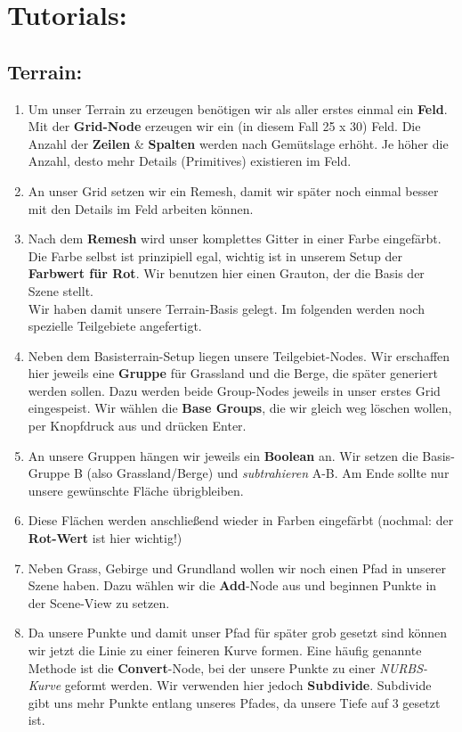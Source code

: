 \documentclass[paper=a4,fontsize=12pt,ngerman]{scrartcl}
\begin{document}
	\section*{\textcolor{rosa}{Tutorials:}}
	\subsection*{Terrain:}
	\begin{enumerate}
		\item Um unser Terrain zu erzeugen benötigen wir als aller erstes einmal ein \textbf{Feld}. Mit der \textbf{Grid-Node} erzeugen wir ein (in diesem Fall 25 x 30) Feld. Die Anzahl der \textbf{Zeilen} \& \textbf{Spalten} werden nach Gemütslage erhöht. Je höher die Anzahl, desto mehr Details (Primitives) existieren im Feld.
		\item An unser Grid setzen wir ein Remesh, damit wir später noch einmal besser mit den Details im Feld arbeiten können.
		\item Nach dem \textbf{Remesh} wird unser komplettes Gitter in einer Farbe eingefärbt. Die Farbe selbst ist prinzipiell egal, wichtig ist in unserem Setup der \textbf{Farbwert für Rot}. Wir benutzen hier einen Grauton, der die Basis der Szene stellt.\\
		Wir haben damit unsere Terrain-Basis gelegt. Im folgenden werden noch spezielle Teilgebiete angefertigt.
		\item Neben dem Basisterrain-Setup liegen unsere Teilgebiet-Nodes. Wir erschaffen hier jeweils eine \textbf{Gruppe} für Grassland und die Berge, die später generiert werden sollen. Dazu werden beide Group-Nodes jeweils in unser erstes Grid eingespeist. Wir wählen die \textbf{Base Groups}, die wir gleich weg löschen wollen, per Knopfdruck aus und drücken Enter.
		\item An unsere Gruppen hängen wir jeweils ein \textbf{Boolean} an. Wir setzen die Basis-Gruppe B (also Grassland/Berge) und \textit{subtrahieren} A-B. Am Ende sollte nur unsere gewünschte Fläche übrigbleiben.
		\item Diese Flächen werden anschließend wieder in Farben eingefärbt (nochmal: der \textbf{Rot-Wert} ist hier wichtig!) 
		\item Neben Grass, Gebirge und Grundland wollen wir noch einen Pfad in unserer Szene haben. Dazu wählen wir die \textbf{Add}-Node aus und beginnen Punkte in der Scene-View zu setzen.
		\item Da unsere Punkte und damit unser Pfad für später grob gesetzt sind können wir jetzt die Linie zu einer feineren Kurve formen. Eine häufig genannte Methode ist die \textbf{Convert}-Node, bei der unsere Punkte zu einer \textit{NURBS-Kurve} geformt werden. Wir verwenden hier jedoch \textbf{Subdivide}. Subdivide gibt uns mehr Punkte entlang unseres Pfades, da unsere Tiefe auf 3 gesetzt ist.

\end{enumerate}
\end{document}
